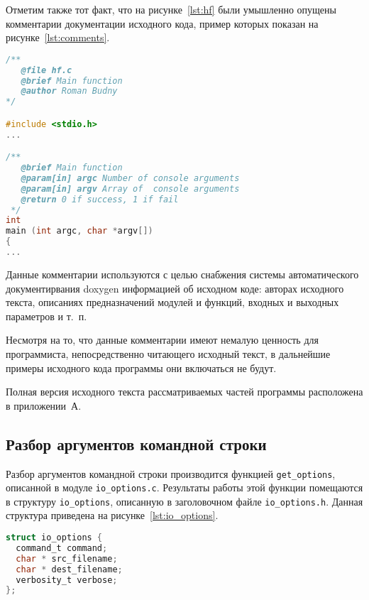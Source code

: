 Отметим также тот факт, что на рисунке~\ref{lst:hf} были умышленно опущены
комментарии документации исходного кода, пример которых показан на 
рисунке~\ref{lst:comments}.

\begin{lstlisting}[basicstyle=\scriptsize\ttfamily,
                   numberstyle=\scriptsize\ttfamily,
                   xleftmargin=7mm,
                   language=C,caption=Пример документации исходного кода,
                   label=lst:comments]
/**
   @file hf.c
   @brief Main function
   @author Roman Budny
*/

#include <stdio.h>
...

/**
   @brief Main function
   @param[in] argc Number of console arguments
   @param[in] argv Array of  console arguments
   @return 0 if success, 1 if fail
 */
int
main (int argc, char *argv[])
{
...
\end{lstlisting}

Данные комментарии используются с целью снабжения системы 
автоматического документирвания doxygen информацией об исходном коде:
авторах исходного текста, описаниях предназначений модулей и функций,
входных и выходных параметров и т.~п. 

Несмотря на то, что данные комментарии имеют немалую ценность для программиста,
непосредственно читающего исходный текст, в дальнейшие примеры исходного кода
программы они включаться не будут.

Полная версия исходного текста рассматриваемых частей программы
расположена в приложении~А. 

\subsection{Разбор аргументов командной строки}

Разбор аргументов командной строки производится функцией \texttt{get\_options},
описанной в модуле \texttt{io\_options.c}. Результаты работы этой функции помещаются в 
структуру \texttt{io\_options}, описанную в заголовочном файле \texttt{io\_options.h}.
Данная структура приведена на рисунке~\ref{lst:io_options}.

\begin{lstlisting}[basicstyle=\scriptsize\ttfamily,
                   numberstyle=\scriptsize\ttfamily,
                   xleftmargin=7mm,
                   language=C,caption=Структура io\_options,
                   label=lst:io_options]
struct io_options {
  command_t command;
  char * src_filename;
  char * dest_filename;
  verbosity_t verbose;
};
\end{lstlisting}

